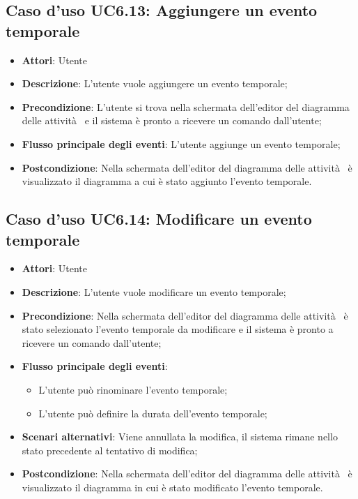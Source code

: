 \documentclass[../AnalisiDeiRequisiti.tex]{subfiles}
\begin{document}
				\subsection{Caso d'uso UC6.13: Aggiungere un evento temporale}
				\begin{itemize}
					\item \textbf{Attori}: Utente
					\item \textbf{Descrizione}: L'utente vuole aggiungere un evento temporale;
					\item \textbf{Precondizione}: L'utente si trova nella schermata dell'editor del diagramma delle attività  e il sistema è pronto a ricevere un comando dall'utente;
					\item \textbf{Flusso principale degli eventi}: L'utente aggiunge un evento temporale;
					\item \textbf{Postcondizione}: Nella schermata dell'editor del diagramma delle attività  è visualizzato il diagramma a cui è stato aggiunto l'evento temporale.
				\end{itemize}
				\subsection{Caso d'uso UC6.14: Modificare un evento temporale}
				\begin{itemize}
					\item \textbf{Attori}: Utente
					\item \textbf{Descrizione}: L'utente vuole modificare un evento temporale;
					\item \textbf{Precondizione}: Nella schermata dell'editor del diagramma delle attività  è stato selezionato l'evento temporale da modificare e il sistema è pronto a ricevere un comando dall'utente;
					\item \textbf{Flusso principale degli eventi}: \begin{itemize}
						\item L'utente può rinominare l'evento temporale;
						\item L'utente può definire la durata dell'evento temporale;
					\end{itemize}
					\item \textbf{Scenari alternativi}: Viene annullata la modifica, il sistema rimane nello stato precedente al tentativo di modifica;
					\item \textbf{Postcondizione}: Nella schermata dell'editor del diagramma delle attività  è visualizzato il diagramma in cui è stato modificato l'evento temporale.
				\end{itemize}
\end{document}

